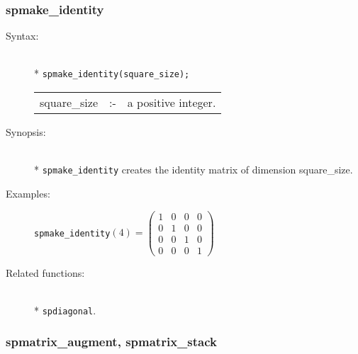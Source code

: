\subsubsection{spmake\_identity}
\label{sparse:spmake_identity}
\hypertarget{operator:SPMAKE_IDENTITY}{}

\begin{description}
\item[Syntax:]\mbox{}\\*
 \texttt{spmake\_identity(square\_size);}\\[2mm]
\begin{tabular}{l l l}
square\_size &:-& a positive integer.
\end{tabular}

\item[Synopsis:]\mbox{}\\*
 \texttt{spmake\_identity} creates the identity matrix of
                dimension square\_size.

\item[Examples:]
\texttt{spmake\_identity}\((4) =
        \begin{pmatrix} 1 & 0 & 0 & 0 \\ 0 & 1 & 0 & 0 \\ 0
& 0 & 1 & 0 \\ 0 & 0 & 0 & 1
\end{pmatrix}\)

\item[Related functions:]\mbox{}\\*
\texttt{spdiagonal}.
\end{description}

\subsubsection{spmatrix\_augment, spmatrix\_stack}
\label{sparse:spmatrix_augment}
\hypertarget{operator:SPMATRIX_AUGMENT}{}

